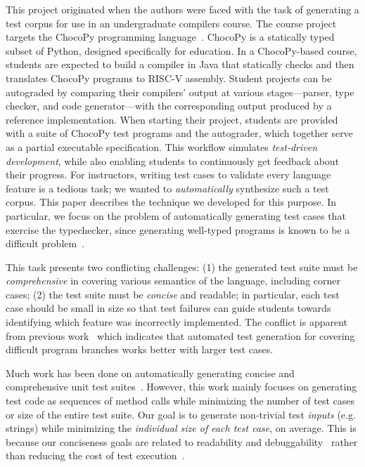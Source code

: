 \documentclass[conference]{IEEEtran}
\begin{document}
This project originated when the authors were faced with the task of generating a test corpus for use in an undergraduate compilers course. The course project targets the ChocoPy programming language~\cite{Padhye19-chocopy}. ChocoPy is a statically typed subset of Python, designed specifically for education. In a ChocoPy-based course, students are expected to build a compiler in Java that statically checks and then translates ChocoPy programs to RISC-V assembly. Student projects can be autograded by comparing their compilers' output at various stages---parser, type checker, and code generator---with the corresponding output produced by a reference implementation. 
When starting their project, students are provided with a suite of ChocoPy test programs and the autograder, which together serve as a partial executable specification. This workflow simulates \emph{test-driven development}, while also enabling students to continuously get feedback about their progress. For instructors, writing test cases to validate every language feature is a tedious task; we wanted to \emph{automatically} synthesize such a test corpus. This paper describes the technique we developed for this purpose. In particular, we focus on the problem of automatically generating test cases that exercise the typechecker, since generating well-typed programs is known to be a difficult problem~\cite{Yang11, Palka11, Dewey15, Fetscher15}.

This task presents two conflicting challenges: (1) the generated test suite must be \emph{comprehensive} in covering various semantics of the language, including corner cases; (2) the test suite must be \emph{concise} and readable; in particular, each test case should be small in size so that test failures can guide students towards identifying which feature was incorrectly implemented. The conflict is apparent from previous work~\cite{Arcuri12} which indicates that automated test generation for covering difficult program branches works better with larger test cases.

Much work has been done on automatically generating concise and comprehensive unit test suites~\cite{Pacheco07, Fraser10, Fraser12}. However, this work mainly focuses on generating test {code} as sequences of method calls while minimizing the {number of test cases} or {size of the entire test suite}. Our goal is to generate non-trivial test \emph{inputs} (e.g. strings) while minimizing the  \emph{individual size of each test case}, on average. This is because our conciseness goals are related to readability and debuggability~\cite{Lei05, Leitner07} rather than reducing the cost of test execution~\cite{Harman10}. 
\end{document}
